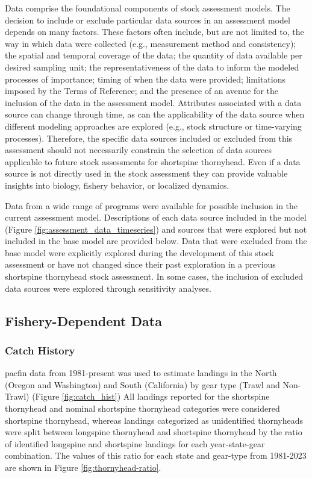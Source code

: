\documentclass[11pt,
  english,
  letterpaper,
]{article}
\begin{document}
Data comprise the foundational components of stock assessment models. The decision to include or exclude particular data sources in an assessment model depends on many factors. These factors often include, but are not limited to, the way in which data were collected (e.g., measurement method and consistency); the spatial and temporal coverage of the data; the quantity of data available per desired sampling unit; the representativeness of the data to inform the modeled processes of importance; timing of when the data were provided; limitations imposed by the Terms of Reference; and the presence of an avenue for the inclusion of the data in the assessment model. Attributes associated with a data source can change through time, as can the applicability of the data source when different modeling approaches are explored (e.g., stock structure or time-varying processes). Therefore, the specific data sources included or excluded from this assessment should not necessarily constrain the selection of data sources applicable to future stock assessments for shortspine thornyhead. Even if a data source is not directly used in the stock assessment they can provide valuable insights into biology, fishery behavior, or localized dynamics.

Data from a wide range of programs were available for possible inclusion in the current assessment model. Descriptions of each data source included in the model (Figure \ref{fig:assessment_data_timeseries}) and sources that were explored but not included in the base model are provided below. Data that were excluded from the base model were explicitly explored during the development of this stock assessment or have not changed since their past exploration in a previous shortspine thornyhead stock assessment. In some cases, the inclusion of excluded data sources were explored through sensitivity analyses.

\hypertarget{fishery-dependent-data}{%
\subsection{Fishery-Dependent Data}\label{fishery-dependent-data}}

\hypertarget{catch-history}{%
\subsubsection{Catch History}\label{catch-history}}

\Gls{pacfin} data from 1981-present was used to estimate landings in the North (Oregon and Washington) and South (California) by gear type (Trawl and Non-Trawl) (Figure \ref{fig:catch_hist}) All landings reported for the shortspine thornyhead and nominal shortspine thornyhead categories were considered shortspine thornyhead, whereas landings categorized as unidentified thornyheads were split between longspine thornyhead and shortspine thornyhead by the ratio of identified longspine and shortspine landings for each year-state-gear combination. The values of this ratio for each state and gear-type from 1981-2023 are shown in Figure \ref{fig:thornyhead-ratio}.
\end{document}
